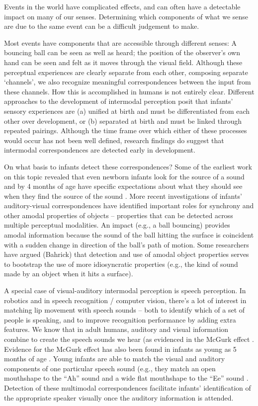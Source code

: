 
Events in the world have complicated effects, and can often have
a detectable impact on many of our senses.  Determining which
components of what we sense are due to the same event can be a 
difficult judgement to make.  %

Most events have components that are accessible through different
senses: A bouncing ball can be seen as well as heard; the position of
the observer's own hand can be seen and felt as it moves through the
visual field.  Although these perceptual experiences are clearly
separate from each other, composing separate `channels', we also
recognize meaningful correspondences between the input from these
channels.  How this is accomplished 
%
in humans 
%
is not entirely clear.  Different
approaches to the development of intermodal perception posit that
infants' sensory experiences are (a) unified at birth and must be
differentiated from each other over development, or (b) separated at
birth and must be linked through repeated pairings. Although the time
frame over which either of these processes would occur has not been
well defined, research findings do suggest that intermodal
correspondences are detected early in development.

On what basis to infants detect these correspondences?  Some of the
earliest work on this topic revealed that even newborn infants look
for the source of a sound \cite{butterworth76coordination} and by 4
months of age have specific expectations about what they should see
when they find the source of the sound \cite{spelke76infants}.  More recent
investigations of infants' auditory-visual correspondences have
identified important roles for synchrony and other amodal properties
of objects -- properties that can be detected across multiple
perceptual modalities.  An impact (e.g., a ball bouncing) provides
amodal information because the sound of the ball hitting the surface
is coincident with a sudden change in direction of the ball's path of
motion.  Some researchers have argued (Bahrick) that detection
and use of amodal object properties serves to bootstrap the use of
more idiosyncratic properties (e.g., the kind of sound made by an
object when it hits a surface).

A special case of visual-auditory intermodal perception is speech
perception.  
%
In robotics and in speech recognition / computer vision, there's
a lot of interest in matching lip movement with speech sounds --
both to identify which of a set of people is speaking, and to
improve recognition performance by adding extra features.
%
We know that in adult humans, auditory and visual
information combine to create the speech sounds we hear (as evidenced
in the McGurk effect \cite{mcgurk76hearing}.  Evidence for the
McGurk effect has also been found in infants as young as 5 months of
age \cite{rosenblum97mcgurk}.  Young infants are able
to match the visual and auditory components of one particular speech
sound (e.g., they match an open mouthshape to the ``Ah'' sound and a
wide flat mouthshape to the ``Ee'' sound \cite{kuhl82bimodal}.
Detection of these multimodal correspondences facilitate infants'
identification of the appropriate speaker visually once the auditory
information is attended.

